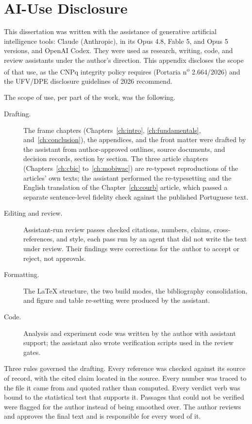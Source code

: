 
\chapter{AI-Use Disclosure}
\label{apx:ai}

This dissertation was written with the assistance of generative artificial
intelligence tools: Claude (Anthropic), in its Opus 4.8, Fable 5, and Opus 5 versions,
and OpenAI Codex. They were used as research, writing, code, and review assistants under
the author's direction. This appendix
discloses the scope of that use, as the CNPq integrity policy requires (Portaria
n\textsuperscript{o} 2.664/2026) and the UFV/DPE disclosure guidelines of 2026 recommend.

The scope of use, per part of the work, was the following.

\begin{description}
  \item[Drafting.] The frame chapters (Chapters~\ref{ch:intro}, \ref{ch:fundamentals},
        and~\ref{ch:conclusion}), the appendices, and the front matter were drafted by
        the assistant from author-approved outlines, source documents, and decision
        records, section by section. The three article chapters
        (Chapters~\ref{ch:cbic} to~\ref{ch:mobiwac}) are re-typeset reproductions of
        the articles' own texts; the assistant performed the re-typesetting and the
        English translation of the Chapter~\ref{ch:courb} article, which passed a
        separate sentence-level fidelity check against the published Portuguese text.
  \item[Editing and review.] Assistant-run review passes checked citations, numbers,
        claims, cross-references, and style, each pass run by an agent that did not
        write the text under review. Their findings were corrections for the author to
        accept or reject, not approvals.
  \item[Formatting.] The LaTeX structure, the two build modes, the bibliography
        consolidation, and figure and table re-setting were produced by the assistant.
  \item[Code.] Analysis and experiment code was written by the author with assistant
        support; the assistant also wrote verification scripts used in the review
        gates.
\end{description}

Three rules governed the drafting. Every reference was checked against its source of
record, with the cited claim located in the source. Every number was traced to the file
it came from and quoted rather than computed.
Every verdict verb was bound to the
statistical test that supports it. Passages that could not be verified were flagged for
the author instead of being smoothed over. The author reviews and approves the final
text and is responsible for every word of it.
